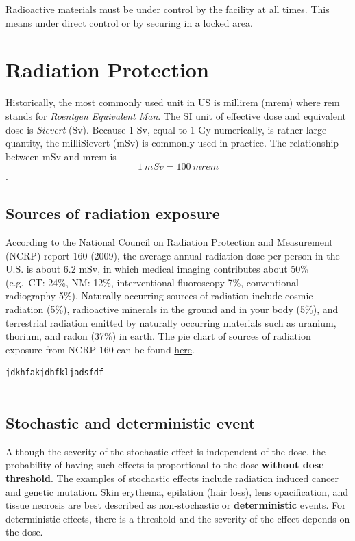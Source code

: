 \documentclass[]{book}
\theoremstyle{definition}
\theoremstyle{definition}
\theoremstyle{definition}
\theoremstyle{remark}
\begin{document}
Radioactive materials must be under control by the facility at all
times. This means under direct control or by securing in a locked area.

\chapter{Radiation Protection}\label{protection}

Historically, the most commonly used unit in US is millirem (mrem) where
rem stands for \emph{Roentgen Equivalent Man}. The SI unit of effective
dose and equivalent dose is \emph{Sievert} (Sv). Because 1 Sv, equal to
1 Gy numerically, is rather large quantity, the milliSievert (mSv) is
commonly used in practice. The relationship between mSv and mrem is
\[1\ mSv = 100\ mrem\].

\section{Sources of radiation
exposure}\label{sources-of-radiation-exposure}

According to the National Council on Radiation Protection and
Measurement (NCRP) report 160 (2009), the average annual radiation dose
per person in the U.S. is about 6.2 mSv, in which medical imaging
contributes about 50\% (e.g.~CT: 24\%, NM: 12\%, interventional
fluoroscopy 7\%, conventional radiography 5\%). Naturally occurring
sources of radiation include cosmic radiation (5\%), radioactive
minerals in the ground and in your body (5\%), and terrestrial radiation
emitted by naturally occurring materials such as uranium, thorium, and
radon (37\%) in earth. The pie chart of sources of radiation exposure
from NCRP 160 can be found
\href{https://19january2017snapshot.epa.gov/radiation/radiation-sources-and-doses_.html}{here}.

\begin{verbatim}
jdkhfakjdhfkljadsfdf
  
\end{verbatim}

\section{Stochastic and deterministic
event}\label{stochastic-and-deterministic-event}

Although the severity of the stochastic effect is independent of the
dose, the probability of having such effects is proportional to the dose
\textbf{without dose threshold}. The examples of stochastic effects
include radiation induced cancer and genetic mutation. Skin erythema,
epilation (hair loss), lens opacification, and tissue necrosis are best
described as non-stochastic or \textbf{deterministic} events. For
deterministic effects, there is a threshold and the severity of the
effect depends on the dose.
\end{document}
